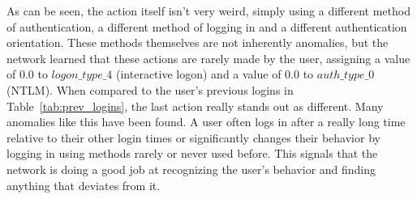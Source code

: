 As can be seen, the action itself isn't very weird, simply using a different method of authentication, a different method of logging in and a different authentication orientation. These methods themselves are not inherently anomalies, but the network learned that these actions are rarely made by the user, assigning a value of 0.0 to \(logon\_type\_4\) (interactive logon) and a value of 0.0 to \(auth\_type\_0\) (NTLM). When compared to the user's previous logins in Table~\ref{tab:prev_logins}, the last action really stands out as different. Many anomalies like this have been found. A user often logs in after a really long time relative to their other login times or significantly changes their behavior by logging in using methods rarely or never used before. This signals that the network is doing a good job at recognizing the user's behavior and finding anything that deviates from it.